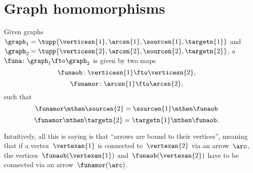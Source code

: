 
\section{Graph homomorphisms}
\begin{definition}
    \label{def:graph_homom}
    Given graphs~$\graph_1=\tupp{\verticesn{1},\arcsn{1},\sourcen{1},\targetn{1}}$ and~$\graph_2=\tupp{\verticesn{2},\arcsn{2},\sourcen{2},\targetn{2}}$, a ~$\funa \colon \graph_1 \fto \graph_2$ is given by two maps~
    \begin{equation}
        \funaob\colon \verticesn{1} \fto \verticesn{2},
    \end{equation}
    \begin{equation}
        \funamor\colon \arcsn{1} \fto \arcsn{2},
    \end{equation}
    such that
    \begin{equation}
        \funamor \mthen \sourcen{2} = \sourcen{1}\mthen \funaob
    \end{equation}
    \begin{equation}
        \funamor \mthen \targetn{2} = \targetn{1}\mthen \funaob.
    \end{equation}
\end{definition}


\begin{remark}
    Intuitively, all this is saying is that ``arrows are bound to their vertices'', meaning that if a vertex~$\vertexan{1}$ is connected to~$\vertexan{2}$ via an arrow~$\arc$, the vertices~$\funaob(\vertexan{1})$ and~$\funaob(\vertexan{2})$ have to be connected via an arrow~$\funamor(\arc)$.
\end{remark}

